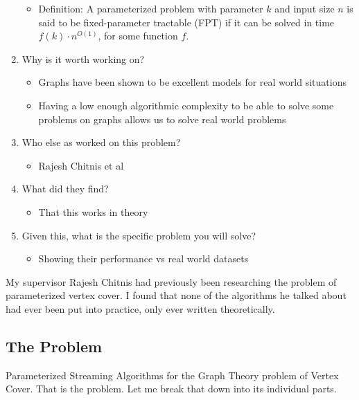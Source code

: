 \begin{enumerate}
\begin{itemize}
              \item Definition: A parameterized problem with parameter $k$ and input size $n$ is said to be fixed-parameter tractable (FPT) if it can be solved in time $f(k) \cdot n^{O(1)}$, for some function $f$.
          \end{itemize}
    \item Why is it worth working on?
          \begin{itemize}
              \item Graphs have been shown to be excellent models for real world situations
              \item Having a low enough algorithmic complexity to be able to solve some problems on graphs allows us to solve real world problems
          \end{itemize}
    \item Who else as worked on this problem?
          \begin{itemize}
              \item Rajesh Chitnis et al
          \end{itemize}
    \item What did they find?
          \begin{itemize}
              \item That this works in theory
          \end{itemize}
    \item Given this, what is the specific problem you will solve?
          \begin{itemize}
              \item Showing their performance vs real world datasets
          \end{itemize}
\end{enumerate}


My supervisor Rajesh Chitnis had previously been researching the problem of parameterized vertex cover. I found that none of the algorithms he talked about had ever been put into practice, only ever written theoretically.

\subsection{The Problem}

Parameterized Streaming Algorithms for the Graph Theory problem of Vertex Cover. That is the problem. Let me break that down into its individual parts.

